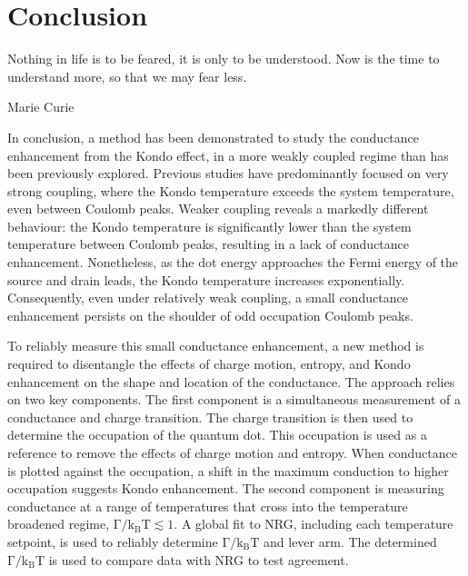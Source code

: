 \chapter{Conclusion}\label{cha:conclusion}


\epigraph{Nothing in life is to be feared, it is only to be understood. Now is the time to understand more, so that we may fear less.}{Marie Curie}

\noindent In conclusion, a method has been demonstrated to study the conductance enhancement from the Kondo effect, in a more weakly coupled regime than has been previously explored. 
Previous studies have predominantly focused on very strong coupling, where the Kondo temperature exceeds the system temperature, even between Coulomb peaks.
Weaker coupling reveals a markedly different behaviour: the Kondo temperature is significantly lower than the system temperature between Coulomb peaks, resulting in a lack of conductance enhancement.
Nonetheless, as the dot energy approaches the Fermi energy of the source and drain leads, the Kondo temperature increases exponentially. 
Consequently, even under relatively weak coupling, a small conductance enhancement persists on the shoulder of odd occupation Coulomb peaks.




To reliably measure this small conductance enhancement, a new method is required to disentangle the effects of charge motion, entropy, and Kondo enhancement on the shape and location of the conductance. 
The approach relies on two key components. 
The first component is a simultaneous measurement of a conductance and charge transition. The charge transition is then used to determine the occupation of the quantum dot. This occupation is used as a reference to remove the effects of charge motion and entropy. When conductance is plotted against the occupation, a shift in the maximum conduction to higher occupation suggests Kondo enhancement. 
The second component is measuring conductance at a range of temperatures that cross into the temperature broadened regime, $\mathrm{\Gamma/k_BT} \lesssim 1$. A global fit to NRG, including each temperature setpoint, is used to reliably determine $\mathrm{\Gamma/k_BT}$ and lever arm. The determined $\mathrm{\Gamma/k_BT}$ is used to compare data with NRG to test agreement. 

